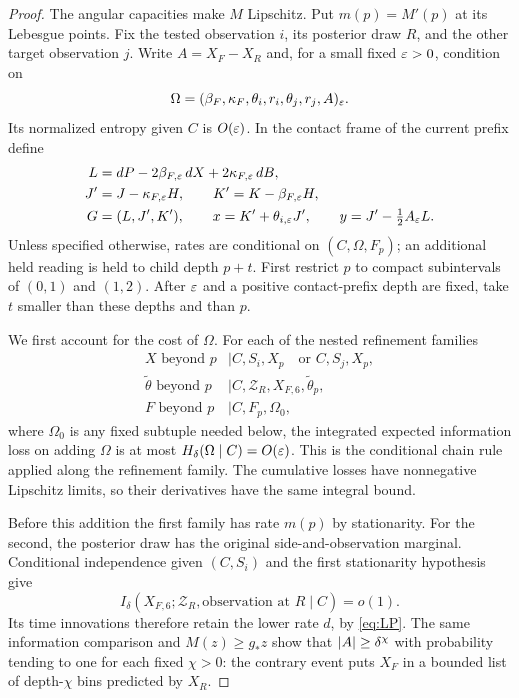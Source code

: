\begin{proof}
The angular capacities make $M$ Lipschitz.  Put $m(p)=M'(p)$ at its
Lebesgue points.  Fix the tested observation $i$, its posterior draw $R$,
and the other target observation $j$.  Write $A=X_F-X_R$ and, for a
small fixed $\varepsilon>0$, condition on
\[
 \Omega=(\beta_F,\kappa_F,\theta_i,r_i,\theta_j,r_j,A)_\varepsilon.
\]
Its normalized entropy given $C$ is $O(\varepsilon)$.  In the contact frame
of the current prefix define
\begin{align*}
 L&=dP-2\beta_{F,\varepsilon}\,dX+2\kappa_{F,\varepsilon}\,dB,\\
 J'&=J-\kappa_{F,\varepsilon}H,\qquad
 K'=K-\beta_{F,\varepsilon}H,\\
 G&=(L,J',K'),\qquad
 x=K'+\theta_{i,\varepsilon}J',\qquad
 y=J'-\tfrac12 A_\varepsilon L.
\end{align*}
Unless specified otherwise, rates are conditional on $(C,\Omega,F_p)$;
an additional held reading is held to child depth $p+t$.
First restrict $p$ to compact subintervals of $(0,1)$ and $(1,2)$.
After $\varepsilon$ and a positive contact-prefix depth are fixed, take
$t$ smaller than these depths and than $p$.

We first account for the cost of $\Omega$.  For each of the nested
refinement families
\begin{equation}\label{act:budget-families}
\begin{array}{ll}
 X\text{ beyond }p &\mid C,S_i,X_p\quad\text{or }C,S_j,X_p,\\
 \widetilde\theta\text{ beyond }p
   &\mid C,\mathscr Z_R,X_{F,6},\widetilde\theta_p,\\
 F\text{ beyond }p &\mid C,F_p,\Omega_0,
\end{array}
\end{equation}
where $\Omega_0$ is any fixed subtuple needed below, the integrated
expected information loss on adding $\Omega$ is at most
$H_\delta(\Omega\mid C)=O(\varepsilon)$.  This is the conditional chain
rule applied along the refinement family.  The cumulative losses have
nonnegative Lipschitz limits, so their derivatives have the same
integral bound.

Before this addition the first family has rate $m(p)$ by stationarity.
For the second, the posterior draw has the original side-and-observation
marginal.  Conditional independence given $(C,S_i)$ and the first
stationarity hypothesis give
\[
 I_\delta(X_{F,6};\mathscr Z_R,\text{observation at }R\mid C)=o(1).
\]
Its time innovations therefore retain the lower rate $d$, by
\eqref{eq:LP}.  The same information comparison and $M(z)\ge g_*z$
show that $\lvert A\rvert\ge\delta^\chi$ with probability tending to one
for each fixed $\chi>0$: the contrary event puts $X_F$ in a bounded
list of depth-$\chi$ bins predicted by $X_R$.


\end{proof}
